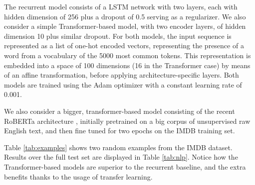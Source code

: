 The recurrent model consists of a LSTM network with two layers, each with hidden dimension of 256 plus a dropout of 0.5 serving as a regularizer. We also consider a simple Transformer-based model, with two encoder layers, of hidden dimension 10 plus similar dropout. For both models, the input sequence is represented as a list of one-hot encoded vectors, representing the presence of a word from a vocabulary of the 5000 most common tokens. This representation is embedded into a space of 100 dimensions
(16 in the Transformer case) by means of an affine transformation, before applying architecture-specific layers. Both models are trained using the Adam optimizer with a constant learning rate of 0.001.

We also consider a bigger, transformer-based model consisting of the recent RoBERTa architecture \parencite{liu2019roberta}, 
initially pretrained on a big corpus of unsupervised raw  English text, and then fine tuned for two epochs on the IMDB training set. %

Table \ref{tab:examples} shows two random examples from the IMDB dataset.
Results over the full test set are displayed in Table \ref{tab:nlp}. Notice how the Transformer-based models are superior to the recurrent baseline, and the extra benefits thanks to the usage of transfer learning.

